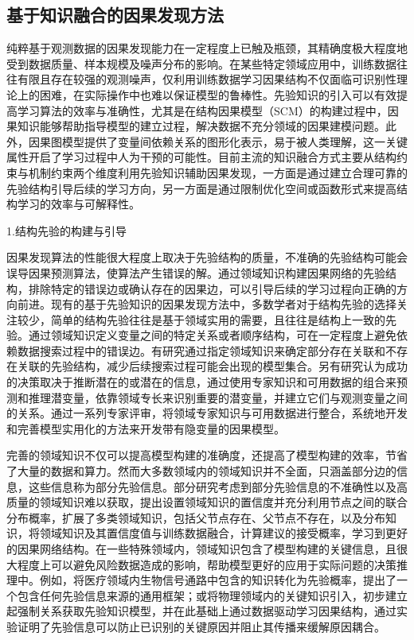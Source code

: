 \subsection{基于知识融合的因果发现方法}
\label{基于知识融合的因果发现方法}
纯粹基于观测数据的因果发现能力在一定程度上已触及瓶颈，其精确度极大程度地受到数据质量、样本规模及噪声分布的影响。在某些特定领域应用中，训练数据往往有限且存在较强的观测噪声，仅利用训练数据学习因果结构不仅面临可识别性理论上的困难，在实际操作中也难以保证模型的鲁棒性。先验知识的引入可以有效提高学习算法的效率与准确性，尤其是在结构因果模型（SCM）的构建过程中，因果知识能够帮助指导模型的建立过程，解决数据不充分领域的因果建模问题。此外，因果图模型提供了变量间依赖关系的图形化表示，易于被人类理解，这一关键属性开启了学习过程中人为干预的可能性。目前主流的知识融合方式主要从结构约束与机制约束两个维度利用先验知识辅助因果发现，一方面是通过建立合理可靠的先验结构引导后续的学习方向，另一方面是通过限制优化空间或函数形式来提高结构学习的效率与可解释性。

{\hei 1.结构先验的构建与引导}

因果发现算法的性能很大程度上取决于先验结构的质量，不准确的先验结构可能会误导因果预测算法，使算法产生错误的解。通过领域知识构建因果网络的先验结构，排除特定的错误边或确认存在的因果边，可以引导后续的学习过程向正确的方向前进。现有的基于先验知识的因果发现方法中，多数学者对于结构先验的选择关注较少，简单的结构先验往往是基于领域实用的需要，且往往是结构上一致的先验\cite{Meng2022}。通过领域知识定义变量之间的特定关系或者顺序结构，可在一定程度上避免依赖数据搜索过程中的错误边。有研究通过指定领域知识来确定部分存在关联和不存在关联的先验结构，减少后续搜索过程可能会出现的模型集合\cite{Hoejsgaard1995}。另有研究认为成功的决策取决于推断潜在的或潜在的信息，通过使用专家知识和可用数据的组合来预测和推理潜变量，依靠领域专长来识别重要的潜变量，并建立它们与观测变量之间的关系\cite{Yet2013}。通过一系列专家评审，将领域专家知识与可用数据进行整合，系统地开发和完善模型实用化的方法来开发带有隐变量的因果模型。

完善的领域知识不仅可以提高模型构建的准确度，还提高了模型构建的效率，节省了大量的数据和算力。然而大多数领域内的领域知识并不全面，只涵盖部分边的信息，这些信息称为部分先验信息。部分研究考虑到部分先验信息的不准确性以及高质量的领域知识难以获取，提出设置领域知识的置信度并充分利用节点之间的联合分布概率，扩展了多类领域知识，包括父节点存在、父节点不存在，以及分布知识，将领域知识及其置信度值与训练数据融合，计算建议的接受概率，学习到更好的因果网络结构\cite{Xu2015}。在一些特殊领域内，领域知识包含了模型构建的关键信息，且很大程度上可以避免风险数据造成的影响，帮助模型更好的应用于实际问题的决策推理中。例如，将医疗领域内生物信号通路中包含的知识转化为先验概率，提出了一个包含任何先验信息来源的通用框架\cite{Boluki2017}；或将物理领域内的关键知识引入，初步建立起强制关系获取先验知识模型，并在此基础上通过数据驱动学习因果结构，通过实验证明了先验信息可以防止已识别的关键原因并阻止其传播来缓解原因耦合\cite{Meng2022}。

